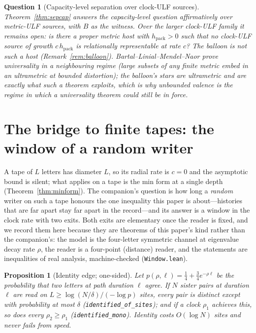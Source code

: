 \documentclass[11pt,reqno]{amsart}
\theoremstyle{plain}
\newtheorem{proposition}[theorem]{Proposition}
\newtheorem{question}[theorem]{Question}
\theoremstyle{definition}
\newcommand{\hpack}{h_{\mathrm{pack}}}
\begin{document}
\begin{question}[Capacity-level separation over clock-ULF sources]\label{q:sep}
Theorem~\ref{thm:sepcap} answers the capacity-level question affirmatively over metric-ULF sources, with $B$ as the witness. Over the larger clock-ULF family it remains open: is there a proper metric host with $\hpack>0$ such that \emph{no} clock-ULF source of growth $c\,\hpack$ is relationally representable at rate $c$? The balloon is not such a host (Remark~\ref{rem:balloon}). Bartal--Linial--Mendel--Naor \cite{blmn2005} prove universality in a neighbouring regime (large subsets of any finite metric embed in an ultrametric at bounded distortion); the balloon's stars are ultrametric and are exactly what such a theorem exploits, which is why unbounded valence is the regime in which a universality theorem could still be in force.
\end{question}

\section{The bridge to finite tapes: the window of a random writer}\label{sec:window}

A tape of $L$ letters has diameter $L$, so its radial rate is $c=0$ and the asymptotic bound is silent; what applies on a tape is the min form at a single depth (Theorem~\ref{thm:minform}). The companion's question is how long a \emph{random} writer on such a tape honours the one inequality this paper is about---histories that are far apart stay far apart in the record---and its answer is a window in the clock rate with two exits. Both exits are elementary once the reader is fixed, and we record them here because they are theorems of this paper's kind rather than the companion's: the model is the four-letter symmetric channel at eigenvalue decay rate $\rho$, the reader is a four-point (distance) reader, and the statements are inequalities of real analysis, machine-checked (\texttt{Window.lean}).

\begin{proposition}[Identity edge; one-sided]\label{prop:identity}
Let $p(\rho,\ell)=\tfrac14+\tfrac34e^{-\rho\ell}$ be the probability that two letters at path duration $\ell$ agree. If $N$ sister pairs at duration $\ell$ are read on $L\ge\log(N/\delta)/(-\log p)$ sites, every pair is distinct except with probability at most $\delta$ (\texttt{identified\_of\_sites}); and if a clock $\rho_1$ achieves this, so does every $\rho_2\ge\rho_1$ (\texttt{identified\_mono}). Identity costs $O(\log N)$ sites and never fails from speed.
\end{proposition}
\end{document}
